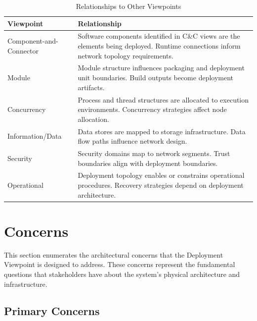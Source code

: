 \documentclass[11pt,letterpaper]{article}
\begin{document}
\begin{table}[H]
\centering
\caption{Relationships to Other Viewpoints}
\begin{tabular}{@{}L{3.5cm}L{10.5cm}@{}}
\toprule
\textbf{Viewpoint} & \textbf{Relationship} \\
\midrule
Component-and-Connector & Software components identified in C\&C views are the elements being deployed. Runtime connections inform network topology requirements. \\
\addlinespace
Module & Module structure influences packaging and deployment unit boundaries. Build outputs become deployment artifacts. \\
\addlinespace
Concurrency & Process and thread structures are allocated to execution environments. Concurrency strategies affect node allocation. \\
\addlinespace
Information/Data & Data stores are mapped to storage infrastructure. Data flow paths influence network design. \\
\addlinespace
Security & Security domains map to network segments. Trust boundaries align with deployment boundaries. \\
\addlinespace
Operational & Deployment topology enables or constrains operational procedures. Recovery strategies depend on deployment architecture. \\
\bottomrule
\end{tabular}
\end{table}

\section{Concerns}

This section enumerates the architectural concerns that the Deployment Viewpoint is designed to address. These concerns represent the fundamental questions that stakeholders have about the system's physical architecture and infrastructure.

\subsection{Primary Concerns}
\end{document}

